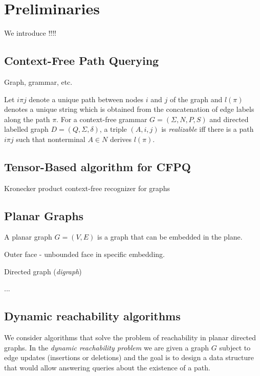 \section{Preliminaries}

We introduce !!!!

\subsection{Context-Free Path Querying}

Graph, grammar, etc.

Let $i\pi j$ denote a unique path between nodes $i$ and $j$ of the graph and $l(\pi)$ denotes a unique string which is obtained from the concatenation of edge labels along the path $\pi$.
For a context-free grammar $G = (\Sigma, N, P, S)$ and directed labelled graph $D = (Q, \Sigma, \delta)$, a triple $(A, i, j)$ is \textit{realizable} iff there is a path $i\pi j$ such that nonterminal $A \in N$ derives $l(\pi)$.

\subsection{Tensor-Based algorithm for CFPQ}

\begin{algorithm}[H]
\begin{algorithmic}[1]
\caption{Kronecker product context-free recognizer for graphs}
\label{alg:Kronecker}
\EndFunction
\end{algorithmic}
\end{algorithm}

\subsection{Planar Graphs}

A planar graph $G = (V, E)$ is a graph that can be embedded in the plane.

Outer face - unbounded face in specific embedding.

Directed graph (\textit{digraph})

...

\subsection{Dynamic reachability algorithms}

We consider algorithms that solve the problem of reachability in planar directed graphs. In the \textit{dynamic reachability problem} we are given a graph $G$ subject to edge updates (insertions or deletions) and the goal is to design a data structure that would allow answering queries about the existence of a path.

